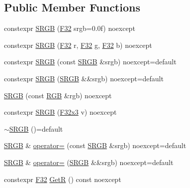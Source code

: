 \subsection*{Public Member Functions}
\begin{DoxyCompactItemize}
\item 
constexpr \mbox{\hyperlink{structmage_1_1_s_r_g_b_a5f1cc4d90aaa3801f1146eb767d45476}{S\+R\+GB}} (\mbox{\hyperlink{namespacemage_aa97e833b45f06d60a0a9c4fc22ae02c0}{F32}} srgb=0.\+0f) noexcept
\item 
constexpr \mbox{\hyperlink{structmage_1_1_s_r_g_b_acf4eb424d13f8ee60065c3d7e118987b}{S\+R\+GB}} (\mbox{\hyperlink{namespacemage_aa97e833b45f06d60a0a9c4fc22ae02c0}{F32}} r, \mbox{\hyperlink{namespacemage_aa97e833b45f06d60a0a9c4fc22ae02c0}{F32}} g, \mbox{\hyperlink{namespacemage_aa97e833b45f06d60a0a9c4fc22ae02c0}{F32}} b) noexcept
\item 
constexpr \mbox{\hyperlink{structmage_1_1_s_r_g_b_a3b895db44e4e6cc72249fadc093cf084}{S\+R\+GB}} (const \mbox{\hyperlink{structmage_1_1_s_r_g_b}{S\+R\+GB}} \&srgb) noexcept=default
\item 
constexpr \mbox{\hyperlink{structmage_1_1_s_r_g_b_aca835f4281827524ad14345ddb28208a}{S\+R\+GB}} (\mbox{\hyperlink{structmage_1_1_s_r_g_b}{S\+R\+GB}} \&\&srgb) noexcept=default
\item 
\mbox{\hyperlink{structmage_1_1_s_r_g_b_a4b56eeabfaee47d0f0685a061947ce59}{S\+R\+GB}} (const \mbox{\hyperlink{structmage_1_1_r_g_b}{R\+GB}} \&rgb) noexcept
\item 
constexpr \mbox{\hyperlink{structmage_1_1_s_r_g_b_abb02103839b539049a6dd54dd7936b16}{S\+R\+GB}} (\mbox{\hyperlink{namespacemage_a0fef5ab4e073c2d9ea876fefa3da4233}{F32x3}} v) noexcept
\item 
\mbox{\hyperlink{structmage_1_1_s_r_g_b_aa5bb0738c6026da6c3e4f54869c52cbc}{$\sim$\+S\+R\+GB}} ()=default
\item 
\mbox{\hyperlink{structmage_1_1_s_r_g_b}{S\+R\+GB}} \& \mbox{\hyperlink{structmage_1_1_s_r_g_b_a08c0aaef872868f2415b5d58c5611764}{operator=}} (const \mbox{\hyperlink{structmage_1_1_s_r_g_b}{S\+R\+GB}} \&srgb) noexcept=default
\item 
\mbox{\hyperlink{structmage_1_1_s_r_g_b}{S\+R\+GB}} \& \mbox{\hyperlink{structmage_1_1_s_r_g_b_a73ee0aadb04bbf07976b1e2daded2aff}{operator=}} (\mbox{\hyperlink{structmage_1_1_s_r_g_b}{S\+R\+GB}} \&\&srgb) noexcept=default
\item 
constexpr \mbox{\hyperlink{namespacemage_aa97e833b45f06d60a0a9c4fc22ae02c0}{F32}} \mbox{\hyperlink{structmage_1_1_s_r_g_b_a0089fdce78dc4da495323f0f6a162546}{GetR}} () const noexcept

\end{DoxyCompactItemize}
